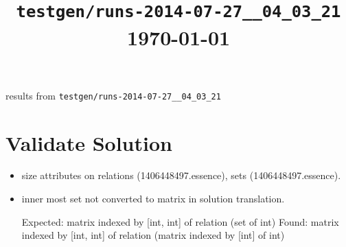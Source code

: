 
\usepackage[left=48pt,right=46pt]{geometry}

\title{\lstinline!testgen/runs-2014-07-27__04_03_21! \\\vspace{2pt}\small{\rm \today}}

\maketitle

results from \lstinline!testgen/runs-2014-07-27__04_03_21!

\section{Validate Solution}

\begin{itemize}
	\item size attributes on relations (1406448497.essence), sets (1406448497.essence).
	
	\item inner most set not converted to matrix in solution translation.
	\begin{lst:essence}[breaklines=true,caption=1406468690.essence]
    Expected: matrix indexed by [int, int] of relation (set of int)
    Found:    matrix indexed by [int, int] of relation (matrix indexed by [int] of int)
	\end{lst:essence}
	

	
\end{itemize}

